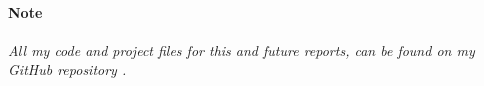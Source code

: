 \documentclass[12pt]{article}
\begin{document}
\paragraph{Note}
\textit{All my code and project files for this and future reports, can be found on my GitHub repository \cite{lybbert2024classwork}.}



\end{document}
